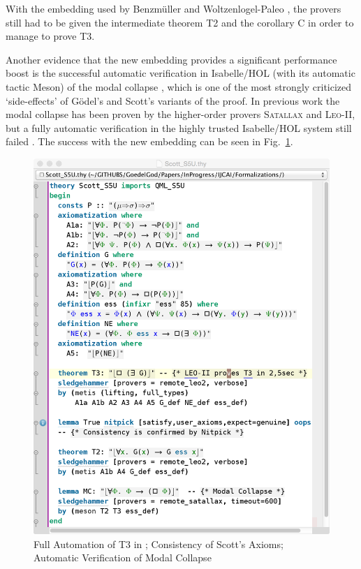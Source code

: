 \documentclass{article}
\begin{document}
With the embedding used by Benzm\"uller and Woltzenlogel-Paleo , the
provers still had to be given the intermediate theorem T2 and the corollary
C in order to manage to prove T3.

Another evidence that the new embedding provides a significant performance boost 
is the successful automatic verification in Isabelle/HOL (with its automatic tactic Meson) of the modal
collapse \cite{Sobel}, which is one of the most strongly criticized
`side-effects' of G\"odel's and Scott's variants of the proof. In previous work 
the modal collapse has been proven by the higher-order provers
\textsc{Satallax} \cite{Satallax} and \textsc{Leo-II}, but a fully automatic
verification in the highly trusted Isabelle/HOL system still failed
\cite{J28}.  The success with the new embedding can be seen in Fig.~\ref{Scott_S5U}.

\begin{figure}[t]
\centerline{\includegraphics[width=\columnwidth]{./Images/Scott_S5U.png}}
\caption{Full Automation of T3 in \SFiveU; Consistency of Scott's
  Axioms;  Automatic Verification of Modal Collapse} \label{Scott_S5U}
\end{figure}
\end{document}
